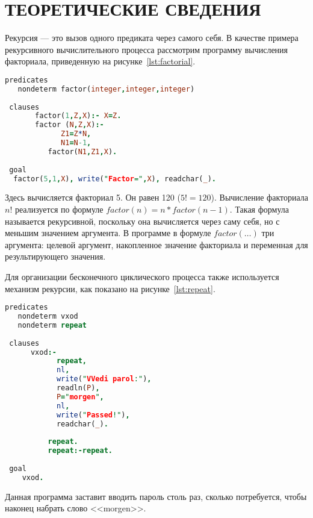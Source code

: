 \section{ТЕОРЕТИЧЕСКИЕ СВЕДЕНИЯ}

Рекурсия --- это вызов одного предиката через самого себя.
В качестве примера рекурсивного вычислительного процесса рассмотрим
программу вычисления факториала, приведенную на рисунке~\ref{lst:factorial}.

\begin{lstlisting}[style=source_code,language=prolog,caption=Программа вычисления факториала в среде Visual Prolog,label=lst:factorial]
 predicates
   nondeterm factor(integer,integer,integer)
 
 clauses
       factor(1,Z,X):- X=Z.
       factor (N,Z,X):-
             Z1=Z*N,
             N1=N-1,
          factor(N1,Z1,X).
      
 goal
  factor(5,1,X), write("Factor=",X), readchar(_).
\end{lstlisting}

Здесь вычисляется факториал 5. Он равен 120 (\(5! = 120\)).
Вычисление факториала \( n! \) реализуется по формуле 
\( factor(n) = n * factor(n-1) \). 
Такая формула называется рекурсивной, поскольку она вычисляется через
саму себя, но с меньшим значением аргумента. 
В программе в формуле \( factor(\dots) \) три аргумента:
целевой аргумент, накопленное значение факториала и переменная
для результирующего значения.

Для организации бесконечного циклического процесса также используется
механизм рекурсии, как показано на рисунке~\ref{lst:repeat}.

\pagebreak
\begin{lstlisting}[style=source_code,language=prolog,caption=Пример организации бесконечного цикла в среде Visual Prolog,label=lst:repeat]
 predicates 
   nondeterm vxod
   nondeterm repeat
 
 clauses
      vxod:-
            repeat,
            nl,
            write("VVedi parol:"),
            readln(P),
            P="morgen",
            nl,
            write("Passed!"),
            readchar(_).
  
          repeat.
          repeat:-repeat.
 
 goal
    vxod.
\end{lstlisting}

Данная программа заставит вводить пароль столь раз, сколько потребуется, чтобы наконец набрать слово <<morgen>>.

\newpage
